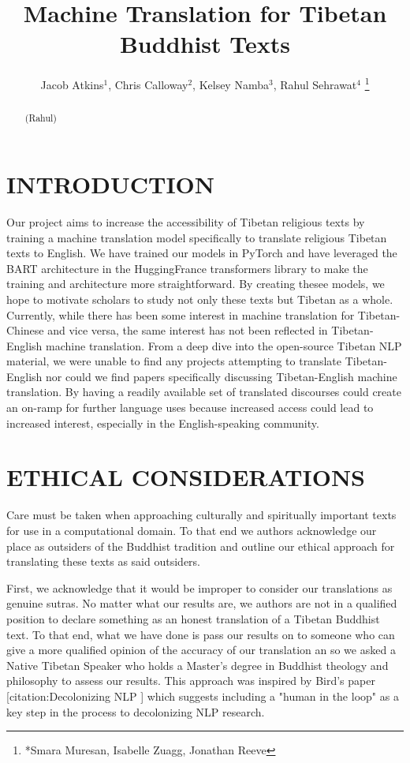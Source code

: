 \documentclass[letterpaper, 10 pt, conference]{ieeeconf}  %
\title{\LARGE \bf
Machine Translation for Tibetan Buddhist Texts
}
\author{ Jacob Atkins$^{1}$, Chris Calloway$^{2}$, Kelsey Namba$^{3}$, Rahul Sehrawat$^{4}$%
\thanks{*Smara Muresan, Isabelle Zuagg, Jonathan Reeve}%

}
\begin{document}
\maketitle
\thispagestyle{empty}
\pagestyle{empty}


\begin{abstract}

(Rahul)

\end{abstract}


\section{INTRODUCTION}

Our project aims to increase the accessibility of Tibetan religious texts by training a machine translation model specifically to translate religious Tibetan texts to English. We have trained our models in PyTorch and have leveraged the BART architecture in the HuggingFrance transformers library to make the training and architecture more straightforward. By creating thesee models, we hope to motivate scholars to study not only these texts but Tibetan as a whole. Currently, while there has been some interest in machine translation for Tibetan-Chinese and vice versa, the same interest has not been reflected in Tibetan-English machine translation. From a deep dive into the open-source Tibetan NLP material, we were unable to find any projects attempting to translate Tibetan-English nor could we find papers specifically discussing Tibetan-English machine translation. By having a readily available set of translated discourses could create an on-ramp for further language uses because increased access could lead to increased interest, especially in the English-speaking community.


\section{ETHICAL CONSIDERATIONS}

Care must be taken when approaching culturally and spiritually important texts for use in a computational domain. To that end we authors acknowledge our place as outsiders of the Buddhist tradition and outline our ethical approach for translating these texts as said outsiders.

First, we acknowledge that it would be improper to consider our translations as genuine sutras. No matter what our results are, we authors are not in a qualified position to declare something as an honest translation of a Tibetan Buddhist text. To that end, what we have done is pass our results on to someone who can give a more qualified opinion of the accuracy of our translation an so we asked a Native Tibetan Speaker who holds a Master's degree in Buddhist theology and philosophy to  assess our results. This approach was inspired by Bird's paper [citation:Decolonizing NLP ] which suggests including a "human in the loop" as a key step in the process to decolonizing NLP research. 
\end{document}
